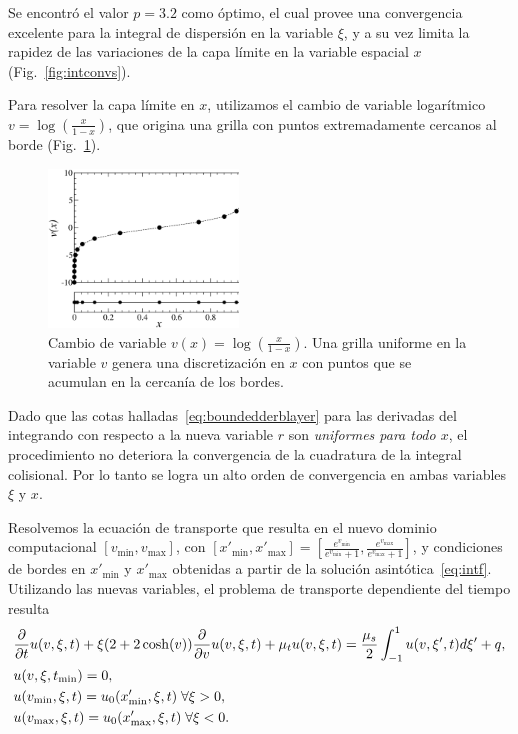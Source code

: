 Se encontró el valor $p=3.2$ como óptimo, el cual 
provee una convergencia excelente para la integral 
de dispersión en la variable $\xi$, y a su vez limita la rapidez 
de las variaciones de la capa límite en la variable espacial $x$ (Fig.~\ref{fig:intconvs}). 

Para resolver la capa límite en $x$, utilizamos 
el cambio de variable logarítmico $v=\log(\frac{x}{1-x})$, 
que origina una grilla con puntos extremadamente cercanos al borde (Fig.~\ref{fig:pindonga}). 
\begin{figure}
  \includegraphics[width=0.45\textwidth]{figuras/puntos.eps}
  \caption{Cambio de variable $v(x) = \log \left( \frac{x}{1-x} \right)$. 
  Una grilla uniforme en la variable $v$ genera una discretización en $x$ 
  con puntos que se acumulan en la cercanía de los bordes.}
 \label{fig:pindonga}
\end{figure}
Dado que las cotas halladas~\eqref{eq:boundedderblayer} para las derivadas del 
integrando con respecto a la nueva variable $r$ son {\em uniformes para todo $x$},  
el procedimiento no deteriora la convergencia de la 
cuadratura de la integral colisional.  Por lo tanto 
se logra un alto orden de convergencia en ambas variables $\xi$ y $x$.

Resolvemos la ecuación de transporte que resulta en el nuevo dominio computacional
\noindent $[v_{\text{min}},v_{\text{max}}]$, con 
$[x'_{\text{min}},x'_{\text{max}}]=[\frac{e^{v_{\text{min}}}}{e^{v_{\text{min}}}+1},
\frac{e^{v_{\text{max}}}}{e^{v_{\text{max}}}+1}]$, 
y condiciones de bordes en $x'_{\text{min}}$ y $x'_{\text{max}}$ 
obtenidas a partir de la solución asintótica~\eqref{eq:intf}.
 Utilizando las nuevas variables, 
el problema de transporte dependiente del tiempo resulta 
\begin{equation}
\begin{split}
&\frac{\partial}{\partial t}u(v,\xi,t)+\xi(2+2\cosh(v)) \frac{\partial}{\partial v}u(v,\xi,t)+\mu_tu(v,\xi,t)=\frac{\mu_s}{2} \int_{-1}^{1} u(v,\xi',t) d\xi'+q, \\
&u(v,\xi,t_{\text{min}})=0,\\
&u(v_{\text{min}},\xi,t)=u_{0}(x'_{\text{min}},\xi,t) \; \forall \xi>0,\\
&u(v_{\text{max}},\xi,t)=u_{0}(x'_{\text{max}},\xi,t) \; \forall \xi<0.
\end{split}
\label{eq:transptd}
\end{equation}

